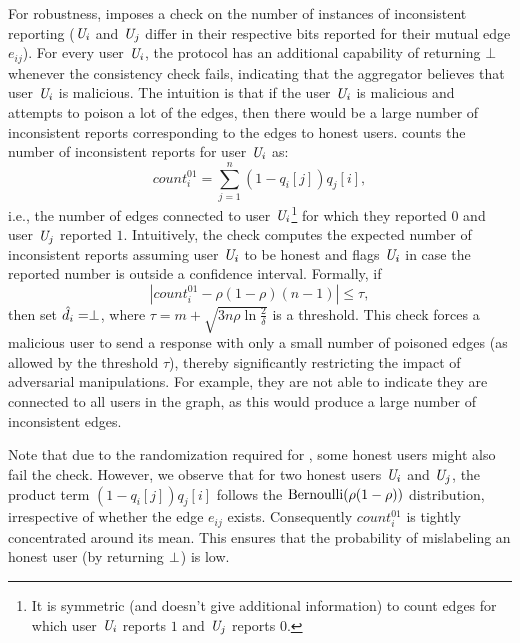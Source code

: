 For robustness, \DegRRCheck{} imposes a check on the number of instances of
inconsistent reporting ($\textit{U}_i$ and $\textit{U}_j$ differ in their respective bits reported for their mutual
edge $e_{ij}$). For every user $\textit{U}_i$,  the protocol has an
additional capability of returning $\bot$ whenever the  consistency check fails, indicating
that the aggregator believes that user $\textit{U}_i$ is malicious. The intuition is that if the user $\textit{U}_i$ is malicious and attempts to poison a lot of the edges, then there would be a large number of inconsistent reports corresponding to the edges to honest users. \DegRRCheck{}  counts the number of inconsistent reports for user $\textit{U}_i$ as: 
\[
  count_i^{01} = \sum_{j=1}^n (1-q_{i}[j]) q_{j}[i],
\]
i.e., the number of edges connected to user $\textit{U}_i$\footnote{It is symmetric (and doesn't give additional information) to count edges for which user $\textit{U}_i$ reports $1$ and $\textit{U}_j$ reports $0$.} for
which they reported $0$ and user $\textit{U}_j$ reported $1$. Intuitively, the check computes the expected number of inconsistent reports assuming user $\textit{U}_i$ to be honest and flags $\textit{U}_i$ in case the reported number is outside a confidence interval. Formally, if
\begin{equation}\label{chap4-eq:deg-check}
    |count_{i}^{01} - \rho(1-\rho)(n-1)| \leq \tau,
\end{equation}
then set $\hat{d}_i = \perp$, where $\tau=m + \sqrt{3 n \rho \ln \tfrac{2}{\delta}}$ is a threshold.  This check forces a malicious user to send a response with only a small number of poisoned edges (as allowed by the threshold $\tau$), thereby significantly restricting the impact of adversarial manipulations. For example, they are not able to indicate they are connected to all users in the graph, as this would produce a large number of inconsistent edges. 

Note that due to the randomization required for \ldp, some honest users might also fail the check. However,  we observe that for two honest users $\textit{U}_i$ and $\textit{U}_j$,  the product term
$(1-q_{i}[j]) q_{j}[i]$ follows the $ \textnormal{Bernoulli}(\rho(1-\rho))$ distribution, irrespective of whether the edge $e_{ij}$ exists. Consequently $count_{i}^{01}$  is tightly concentrated around its mean.  This ensures that the probability of mislabeling an honest user (by returning $\perp$) is low. 
\setlength{\textfloatsep}{4pt}

